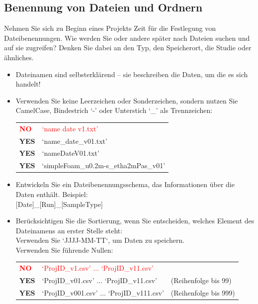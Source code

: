 \subsection{Benennung von Dateien und Ordnern }

Nehmen Sie sich zu Beginn eines Projekts Zeit für die Festlegung von
Dateibenennungen. Wie werden Sie oder andere später nach Dateien suchen und auf
sie zugreifen? Denken Sie dabei an den Typ, den Speicherort, die Studie oder
ähnliches.
\begin{itemize}
  \item Dateinamen sind selbsterklärend – sie beschreiben die Daten,
        um die es sich handelt!
  \item Verwenden Sie keine Leerzeichen oder Sonderzeichen, sondern nutzen Sie
        CamelCase, Bindestrich ‘-’ oder Unterstich ‘\_’ als Trennzeichen: \\
        \begin{tabular}{ll}
          \textcolor{red}{\textbf{NO}}  & \textcolor{red}{‘name date v1.txt’} \\
          \textbf{YES} & ‘name\_date\_v01.txt’ \\
          \textbf{YES} & ‘nameDateV01.txt’ \\
          \textbf{YES} & ‘simpleFoam\_u0.2m-s\_etha2mPas\_v01’ \\
        \end{tabular}
  \item Entwickeln Sie ein Dateibenennungsschema, das Informationen über die
        Daten enthält. Beispiel: \\
        {[Date]}\_{[Run]}\_{[SampleType]}
  \item Berücksichtigen Sie die Sortierung, wenn Sie entscheiden, welches
        Element des Dateinamens an erster Stelle steht: \\
        Verwenden Sie ‘JJJJ-MM-TT‘, um Daten zu speichern. \\
        Verwenden Sie führende Nullen: \\
        \begin{tabular}{lll}
          \textcolor{red}{\textbf{NO}}  & \textcolor{red}{‘ProjID\_v1.csv’  	...  	‘ProjID\_v11.csv’} & \\
          \textbf{YES} & ‘ProjID\_v01.csv’ 	... 	‘ProjID\_v11.csv’
             & (Reihenfolge bis 99) \\
          \textbf{YES} & ‘ProjID\_v001.csv’ 	...	‘ProjID\_v111.csv’
             & (Reihenfolge bis 999) \\
        \end{tabular}
\end{itemize}

